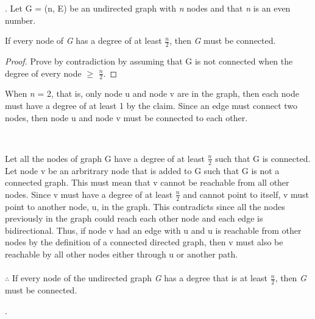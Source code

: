 \documentclass[12pt, a4paper]{article}
\begin{document}
. Let G = (n, E) be an undirected graph with \emph{n} nodes and that \emph{n} is an even number.
\\
\begin{claim}
    If every node of \emph{G} has a degree of at least \(\frac{n}{2}\), then \emph{G} must be connected.
\end{claim}

\begin{proof}
    Prove by contradiction by assuming that G is not connected when the degree of every node \(\geq\) \(\frac{n}{2}\). 
\end{proof}

\begin{base}
When \emph{n} = 2, that is, only node u and node v are in the graph, then each node must have a degree of at least 1 by the claim. 
Since an edge must connect two nodes, then node u and node v must be connected to each other.
\end{base}
\\
\begin{inductive}
    Let all the nodes of graph G have a degree of at least \(\frac{n}{2}\) such that G is connected.
    Let node v be an arbritrary node that is added to G such that G is not a connected graph.
    This must mean that v cannot be reachable from all other nodes.
    Since v must have a degree of at least \(\frac{n}{2}\) and cannot point to itself, v must point to another node, u, in the graph.
    This contradicts since all the nodes previously in the graph could reach each other node and each edge is bidirectional.
    Thus, if node v had an edge with u and u is reachable from other nodes by the definition of a connected directed graph, then v must also be reachable by all other nodes either through u or another path.
    \\
    \\
    \(\therefore\) If every node of the undirected graph \emph{G} has a degree that is at least \(\frac{n}{2}\), then \emph{G} must be connected.
\end{inductive}
.
\\
\end{document}
